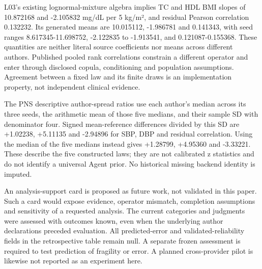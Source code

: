 \documentclass[11pt,letterpaper]{article}
\begin{document}
L03's existing lognormal-mixture algebra implies TC and HDL BMI slopes of 10.872168 and -2.105832 mg/\allowbreak{}dL per 5 kg/\allowbreak{}m², and residual Pearson correlation 0.132232. Its generated means are 10.015112, -1.986781 and 0.141343, with seed ranges 8.617345-11.698752, -2.122835 to -1.913541, and 0.121087-0.155368. These quantities are neither literal source coefficients nor means across different authors. Published pooled rank correlations constrain a different operator and enter through disclosed copula, conditioning and population assumptions. Agreement between a fixed law and its finite draws is an implementation property, not independent clinical evidence.


The PNS descriptive author-spread ratios use each author's median across its three seeds, the arithmetic mean of those five medians, and their sample SD with denominator four. Signed mean-reference differences divided by this SD are +1.02238, +5.11135 and -2.94896 for SBP, DBP and residual correlation. Using the median of the five medians instead gives +1.28799, +4.95360 and -3.33221. These describe the five constructed laws; they are not calibrated z statistics and do not identify a universal Agent prior. No historical missing backend identity is imputed.


An analysis-support card is proposed as future work, not validated in this paper. Such a card would expose evidence, operator mismatch, completion assumptions and sensitivity of a requested analysis. The current categories and judgments were assessed with outcomes known, even when the underlying author declarations preceded evaluation. All predicted-error and validated-reliability fields in the retrospective table remain null. A separate frozen assessment is required to test prediction of fragility or error. A planned cross-provider pilot is likewise not reported as an experiment here.
\end{document}
